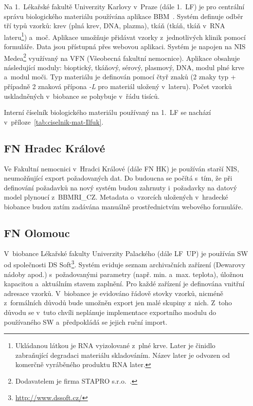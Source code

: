 \documentclass[11pt, final, oneside]{fithesis2}
\newcommand{\ProjectName}{\mbox{BBMRI\_CZ}\xspace}
\begin{document}
Na 1.~Lékařské fakultě Univerzity Karlovy v~Praze (dále 1.~LF) je pro centrální správu biologického materiálu používána aplikace BBM~\cite{1LF_BBM}. Systém definuje odběr tří typů vzorků: krev (plná krev, DNA, plazma), tkáň (tkáň, tkáň v~RNA lateru\footnote{Ukládanou látkou je RNA vyizolované z~plné krve. Later je činidlo zabraňující degradaci materiálu skladováním. Název later je odvozen od komerčně vyráběného produktu RNA later.}) a~moč. Aplikace umožňuje přidávat vzorky z~jednotlivých klinik pomocí formuláře. Data jsou přístupná přes webovou aplikaci.
Systém je napojen na NIS Medea\footnote{Dodavatelem je firma STAPRO s.r.o.~\cite{Medea}.} využívaný na VFN (Všeobecná fakultní nemocnice). 
Aplikace obsahuje následující moduly:  bioptický, tkáňový, sérový, plasmový, DNA, modul plné krve a~modul moči.
Typ materiálu je definován pomocí čtyř znaků (2 znaky typ + případně 2 znaková přípona \textit{-L} pro materiál uložený v~lateru). Počet vzorků uskladněných v~biobance se pohybuje v~řádu tisíců.

Interní číselník biologického materiálu používaný na 1.~LF se nachází v~příloze~\ref{tab:ciselnik-mat-Ilfuk}.

\subsection{FN Hradec Králové}
Ve Fakultní nemocnici v~Hradci Králové (dále FN HK) je používán starší NIS, neumožňující export požadovaných dat. Do budoucna se počítá s~tím, že při definování požadavků na nový systém budou zahrnuty i~požadavky na datový model plynoucí z~\ProjectName. Metadata o~vzorcích uložených v~hradecké biobance budou zatím zadávána manuálně prostřednictvím webového formuláře.

\subsection{FN Olomouc}
V~biobance Lékařské fakulty Univerzity Palackého (dále LF~UP) je používán SW od společnosti DS Soft\footnote{\url{http://www.dssoft.cz/}}. Systém eviduje seznam archivačních zařízení (Dewarovy nádoby apod.) s~požadovanými parametry (např. min. a~max. teplota), úložnou kapacitou a~aktuálním stavem zaplnění. Pro každé zařízení je definována vnitřní adresace vzorků.
V~biobance je evidováno řádově stovky vzorků, nicméně z~formálních důvodů bude umožněn export jen malé skupiny z~nich. Z~toho důvodu se v~tuto chvíli neplánuje implementace exportního modulu do používaného SW a~předpokládá se jejich ruční import.
\end{document}
